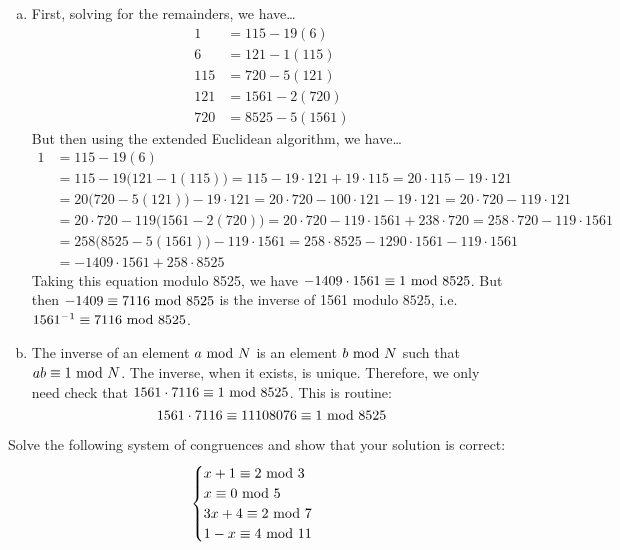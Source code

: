 \documentclass[12pt,letterpaper]{exam}
\begin{document}
\begin{questions}
{\begin{enumerate}[(a)]
\item First, solving for the remainders, we have\dots
	\[
	\begin{aligned}
	1&= 115 - 19(6) \\
	6&= 121 - 1(115) \\
	115&= 720 - 5(121) \\
	121&= 1561 - 2(720) \\
	720&= 8525 - 5(1561)
	\end{aligned}
	\]
But then using the extended Euclidean algorithm, we have\dots
	\[
	\begin{aligned}
	1&= 115 - 19(6) \\
	&= 115 - 19 \big(121 - 1(115) \big)= 115 - 19 \cdot 121 + 19 \cdot 115= 20 \cdot 115 - 19 \cdot 121 \\
	&= 20 \big(720 - 5(121) \big) - 19 \cdot 121= 20 \cdot 720 - 100 \cdot 121 - 19 \cdot 121= 20 \cdot 720 - 119 \cdot 121 \\
	&= 20 \cdot 720 - 119 \big(1561 - 2(720) \big)= 20 \cdot 720 - 119 \cdot 1561 + 238 \cdot 720= 258 \cdot 720 - 119 \cdot 1561 \\
	&= 258 \big(8525 - 5(1561) \big) - 119 \cdot 1561= 258 \cdot 8525 - 1290 \cdot 1561 - 119 \cdot 1561 \\
	&= -1409 \cdot 1561 + 258 \cdot 8525 
	\end{aligned}
	\]
Taking this equation modulo 8525, we have $-1409 \cdot 1561 \equiv 1 \text{ mod } 8525$. But then $-1409 \equiv 7116 \text{ mod } 8525$ is the inverse of 1561 modulo $8525$, i.e. $1561^{-1} \equiv 7116 \text{ mod } 8525$. \pspace

\item The inverse of an element $a \text{ mod } N$ is an element $b \text{ mod } N$ such that $ab \equiv 1 \text{ mod } N$. The inverse, when it exists, is unique. Therefore, we only need check that $1561 \cdot 7116 \equiv 1 \text{ mod } 8525$. This is routine:
	\[
	1561 \cdot 7116 \equiv 11108076 \equiv 1 \text{ mod } 8525
	\]
\end{enumerate}
}



\newpage
\question[10] Solve the following system of congruences and show that your solution is correct:
	\[
	\begin{cases}
	x + 1 \equiv 2 \text{ mod } 3 \\
	x \equiv 0 \text{ mod } 5 \\
	3x + 4 \equiv 2 \text{ mod } 7 \\
	1 - x \equiv 4 \text{ mod } 11
	\end{cases}
	\] \pspace


\end{questions}
\end{document}
